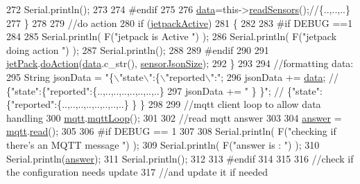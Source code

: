 \begin{DoxyCode}
272         Serial.println();
273     
274 \textcolor{preprocessor}{    #endif}
275 
276         \hyperlink{classCoolBoard_a427fb753dd8575bdf821c70a5c63d695}{data}=this->\hyperlink{classCoolBoard_ad03abdce2e65f520bbf2cff0f2d083cf}{readSensors}();\textcolor{comment}{//\{..,..,..\}}
277     \}
278     
279     \textcolor{comment}{//do action}
280     \textcolor{keywordflow}{if} (\hyperlink{classCoolBoard_a9be03a913d26e558328935ca3b59a75e}{jetpackActive})
281     \{
282     
283 \textcolor{preprocessor}{    #if DEBUG ==1}
284 
285         Serial.println( F(\textcolor{stringliteral}{"jetpack is Active "}) );
286         Serial.println( F(\textcolor{stringliteral}{"jetpack doing action "}) );
287         Serial.println();
288 
289 \textcolor{preprocessor}{    #endif}
290 
291         \hyperlink{classCoolBoard_a30b1357881b01ccbec676856a91e48e9}{jetPack}.\hyperlink{classJetpack_a86d2e83436ef4b85f4c3a6e85ac785b0}{doAction}(\hyperlink{classCoolBoard_a427fb753dd8575bdf821c70a5c63d695}{data}.c\_str(), \hyperlink{classCoolBoard_a58e4b6072e3ac8b141ec0befb479208e}{sensorJsonSize});
292     \}
293     
294     \textcolor{comment}{//formatting data:}
295     String jsonData = \textcolor{stringliteral}{"\{\(\backslash\)"state\(\backslash\)":\{\(\backslash\)"reported\(\backslash\)":"};
296     jsonData += \hyperlink{classCoolBoard_a427fb753dd8575bdf821c70a5c63d695}{data}; \textcolor{comment}{// \{"state":\{"reported":\{..,..,..,..,..,..,..,..\}}
297     jsonData += \textcolor{stringliteral}{" \} \}"}; \textcolor{comment}{// \{"state":\{"reported":\{..,..,..,..,..,..,..,..\}  \} \}}
298     
299     \textcolor{comment}{//mqtt client loop to allow data handling}
300     \hyperlink{classCoolBoard_a2399f44d7c23c1149a335cb3b46d90f1}{mqtt}.\hyperlink{classCoolMQTT_aa5eaae967b562b62cbcf2b8d81f6e5d5}{mqttLoop}();
301 
302     \textcolor{comment}{//read mqtt answer}
303     
304     \hyperlink{classCoolBoard_a7b835fafd449e5282f7f91d787a2dc15}{answer} = \hyperlink{classCoolBoard_a2399f44d7c23c1149a335cb3b46d90f1}{mqtt}.\hyperlink{classCoolMQTT_ae3c18f6ae9723746d32765f1c8f176ca}{read}();
305 
306 \textcolor{preprocessor}{#if DEBUG == 1 }
307 
308     Serial.println( F(\textcolor{stringliteral}{"checking if there's an MQTT message "})  );
309     Serial.println( F(\textcolor{stringliteral}{"answer is : "}) );    
310     Serial.println(\hyperlink{classCoolBoard_a7b835fafd449e5282f7f91d787a2dc15}{answer});   
311     Serial.println();
312 
313 \textcolor{preprocessor}{#endif  }
314 
315 
316     \textcolor{comment}{//check if the configuration needs update }
317     \textcolor{comment}{//and update it if needed }

\end{DoxyCode}
